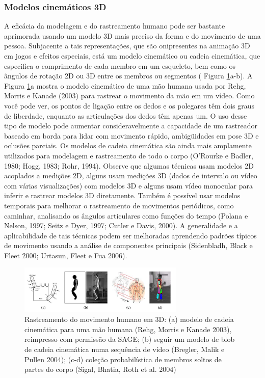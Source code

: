 \documentclass{article}
\begin{document}
\subsubsection{Modelos cinemáticos 3D}
A eficácia da modelagem e do rastreamento humano pode ser bastante aprimorada usando um modelo 3D mais preciso da forma e do movimento de uma pessoa. Subjacente a tais representações, que são onipresentes na animação 3D em jogos e efeitos especiais, está um modelo cinemático ou cadeia cinemática, que especifica o comprimento de cada membro em um esqueleto, bem como os ângulos de rotação 2D ou 3D entre os membros ou segmentos ( Figura \ref{fig:img7}a-b).
A Figura \ref{fig:img7}a mostra o modelo cinemático de uma mão humana usada por Rehg, Morris e Kanade (2003) para rastrear o movimento da mão em um vídeo. Como você pode ver, os pontos de ligação entre os dedos e os polegares têm dois graus de liberdade, enquanto as articulações dos dedos têm apenas um. O uso desse tipo de modelo pode aumentar consideravelmente a capacidade de um rastreador baseado em borda para lidar com movimento rápido, ambigüidades em pose 3D e oclusões parciais. Os modelos de cadeia cinemática são ainda mais amplamente utilizados para modelagem e rastreamento de todo o corpo (O'Rourke e Badler, 1980; Hogg, 1983; Rohr, 1994). Observe que algumas técnicas usam modelos 2D acoplados a medições 2D, alguns usam medições 3D (dados de intervalo ou vídeo com várias visualizações) com modelos 3D e alguns usam vídeo monocular para inferir e rastrear modelos 3D diretamente. Também é possível usar modelos temporais para melhorar o rastreamento de movimentos periódicos, como caminhar, analisando os ângulos articulares como funções do tempo (Polana e Nelson, 1997; Seitz e Dyer, 1997; Cutler e Davis, 2000). A generalidade e a aplicabilidade de tais técnicas podem ser melhoradas aprendendo padrões típicos de movimento usando a análise de componentes principais (Sidenbladh, Black e Fleet 2000; Urtasun, Fleet e Fua 2006).

\begin{figure}[!htb]
    \centering
    \includegraphics[width=0.7\textwidth]{img8.png}
    \caption{Rastreamento do movimento humano em 3D: (a) modelo de cadeia cinemática para uma mão humana (Rehg, Morris e Kanade 2003), reimpresso com permissão da SAGE; (b) seguir um modelo de blob de cadeia cinemática numa sequência de vídeo (Bregler, Malik e Pullen 2004); (c-d) coleção probabilística de membros soltos de partes do corpo (Sigal, Bhatia, Roth et al. 2004)
}
    \label{fig:img7}
\end{figure}
\end{document}
